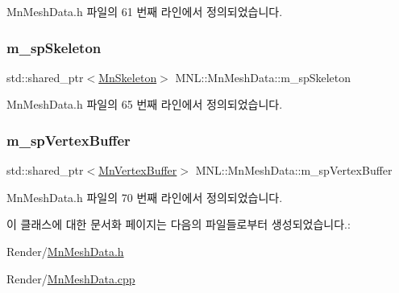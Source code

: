 Mn\+Mesh\+Data.\+h 파일의 61 번째 라인에서 정의되었습니다.

\mbox{\label{class_m_n_l_1_1_mn_mesh_data_a04f503f266ee9d9a01567c64e3b2367a}} 
\subsubsection{\texorpdfstring{m\+\_\+sp\+Skeleton}{m\_spSkeleton}}
{\footnotesize\ttfamily std\+::shared\+\_\+ptr$<$\hyperlink{class_m_n_l_1_1_mn_skeleton}{Mn\+Skeleton}$>$ M\+N\+L\+::\+Mn\+Mesh\+Data\+::m\+\_\+sp\+Skeleton\hspace{0.3cm}{\ttfamily [private]}}



Mn\+Mesh\+Data.\+h 파일의 65 번째 라인에서 정의되었습니다.

\mbox{\label{class_m_n_l_1_1_mn_mesh_data_aa831d4cca73f55e0c67f47baee413ad3}} 
\subsubsection{\texorpdfstring{m\+\_\+sp\+Vertex\+Buffer}{m\_spVertexBuffer}}
{\footnotesize\ttfamily std\+::shared\+\_\+ptr$<$\hyperlink{class_m_n_l_1_1_mn_vertex_buffer}{Mn\+Vertex\+Buffer}$>$ M\+N\+L\+::\+Mn\+Mesh\+Data\+::m\+\_\+sp\+Vertex\+Buffer\hspace{0.3cm}{\ttfamily [private]}}



Mn\+Mesh\+Data.\+h 파일의 70 번째 라인에서 정의되었습니다.



이 클래스에 대한 문서화 페이지는 다음의 파일들로부터 생성되었습니다.\+:\begin{DoxyCompactItemize}
\item 
Render/\hyperlink{_mn_mesh_data_8h}{Mn\+Mesh\+Data.\+h}\item 
Render/\hyperlink{_mn_mesh_data_8cpp}{Mn\+Mesh\+Data.\+cpp}\end{DoxyCompactItemize}
